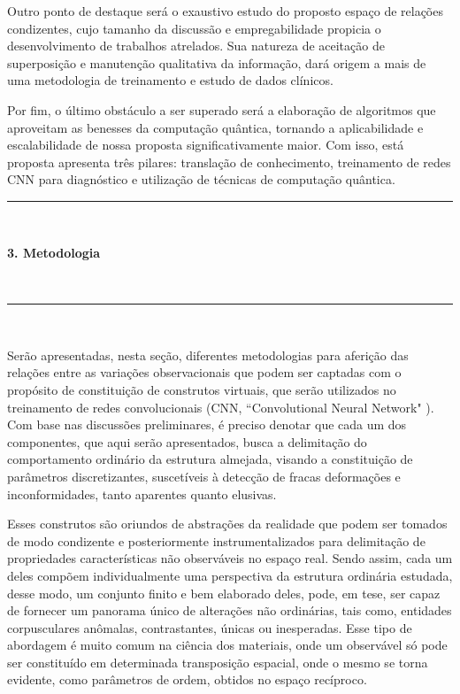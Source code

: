 \documentclass[a4paper, 12pt]{report}
\begin{document}
Outro ponto de destaque será o exaustivo estudo do proposto espaço de relações condizentes, cujo tamanho da discussão e empregabilidade propicia o desenvolvimento de trabalhos atrelados. Sua natureza de aceitação de superposição e manutenção qualitativa da informação, dará origem a mais de uma metodologia de treinamento e estudo de dados clínicos.

Por fim, o último obstáculo a ser superado será a elaboração de algoritmos que aproveitam as benesses da computação quântica, tornando a aplicabilidade e escalabilidade de nossa proposta significativamente maior. Com isso, está proposta apresenta três pilares: translação de conhecimento, treinamento de redes CNN para diagnóstico e utilização de técnicas de computação quântica.

\newpage
\hrule $\frac{}{}$\\
\begin{LARGE}
	\textbf{3. Metodologia}
\end{LARGE}
\\ \hrule $\frac{}{}$\par

Serão apresentadas, nesta seção, diferentes metodologias para aferição das relações entre as variações observacionais que podem ser captadas com o propósito de constituição de construtos virtuais, que serão utilizados no treinamento de redes convolucionais (CNN, ``Convolutional Neural Network" ). Com base nas discussões preliminares, é preciso denotar que cada um dos componentes, que aqui serão apresentados, busca a delimitação do comportamento ordinário da estrutura almejada, visando a constituição de parâmetros discretizantes, suscetíveis à detecção de fracas deformações e inconformidades, tanto aparentes quanto elusivas.

Esses construtos são oriundos de abstrações da realidade que podem ser tomados de modo condizente e posteriormente instrumentalizados para delimitação de propriedades características não observáveis no espaço real. Sendo assim, cada um deles compõem individualmente uma perspectiva da estrutura ordinária estudada, desse modo, um conjunto finito e bem elaborado deles, pode, em tese, ser capaz de fornecer um panorama único de alterações não ordinárias, tais como, entidades corpusculares anômalas, contrastantes, únicas ou inesperadas. Esse tipo de abordagem é muito comum na ciência dos materiais, onde um observável só pode ser constituído em determinada transposição espacial, onde o mesmo se torna evidente, como parâmetros de ordem, obtidos no espaço recíproco.
\end{document}
